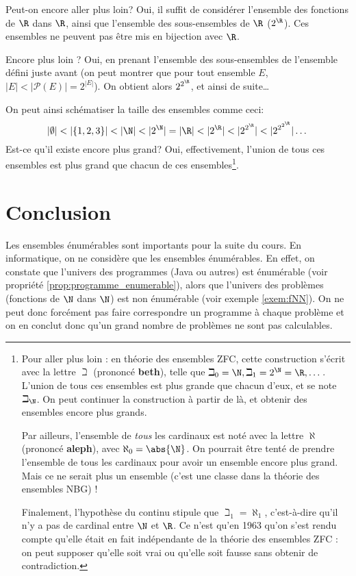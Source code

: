 Peut-on encore aller plus loin?  Oui, il suffit de considérer l'ensemble des fonctions de $\R$ dans $\R$, ainsi que
l'ensemble des sous-ensembles de $\R$ ($2^{\R}$). Ces ensembles ne peuvent pas être mis en bijection avec $\R$.

Encore plus loin ? Oui, en prenant l'ensemble des sous-ensembles de l'ensemble défini juste avant (on peut montrer que pour tout ensemble $E$, $|E|<|\mathcal{P}(E)|=2^{|E|}$). On obtient alors $2^{2^{\R}}$, et ainsi de suite\ldots

On peut ainsi schématiser la taille des ensembles comme ceci:
$$|\emptyset| < |\{1,2,3\}| < |\N| < |2^\N| = |\R| < |2^{\R}| < |2^{2^{\R}}| < |2^{2^{2^{\R}}}| \dots$$
Est-ce qu'il existe encore plus grand? Oui, effectivement, l'union de tous ces ensembles
est plus grand que chacun de ces ensembles\footnote{
Pour aller plus loin : en théorie des ensembles ZFC, cette construction s'écrit avec la lettre $\beth$ (prononcé \textbf{beth}), telle que $\beth_0 = \N, \beth_1 = 2^\N = \R,\dots$. L'union de tous ces ensembles est plus grande que chacun d'eux, et se note $\beth_\N$. On peut continuer la construction à partir de là, et obtenir des ensembles encore plus grands.

Par ailleurs, l'ensemble de \emph{tous} les cardinaux est noté avec la lettre $\aleph$ (prononcé \textbf{aleph}), avec $\aleph_0 = \abs{\N}$. On pourrait être tenté de prendre l'ensemble de tous les cardinaux pour avoir un ensemble encore plus grand. Mais ce ne serait plus un ensemble (c'est une classe dans la théorie des ensembles NBG) !

Finalement, l'hypothèse du continu stipule que $\beth_1 = \aleph_1$, c'est-à-dire qu'il n'y a pas de cardinal entre $\N$ et $\R$. Ce n'est qu'en 1963 qu'on s'est rendu compte qu'elle était en fait indépendante de la théorie des ensembles ZFC : on peut supposer qu'elle soit vrai ou qu'elle soit fausse sans obtenir de contradiction.}.

\section{Conclusion}
\label{sec:concept_conclusion}

Les ensembles énumérables sont importants pour la suite du cours. En
informatique, on ne considère que les ensembles énumérables. En effet, on constate que l'univers des programmes (Java ou autres) est énumérable (voir propriété \ref{prop:programme_enumerable}), alors que l'univers des problèmes (fonctions de $\N$ dans $\N$) est non énumérable (voir exemple \ref{exem:fNN}).
On ne peut donc forcément pas faire correspondre un programme à chaque problème et on en conclut donc qu'un grand nombre de problèmes ne sont pas calculables.


